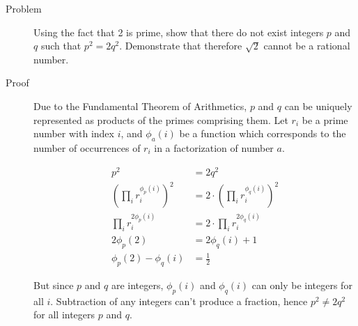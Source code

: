 \begin{description}
\item[Problem] Using the fact that 2 is prime, show that there do not exist
integers $p$ and $q$ such that $p^2 = 2q^2$. Demonstrate that therefore $\sqrt
2$ cannot be a rational number.

\item[Proof] Due to the Fundamental Theorem of Arithmetics, $p$ and $q$ can be
uniquely represented as products of the primes comprising them. Let $r_i$ be a
prime number with index $i$, and $\phi_a(i)$ be a function which corresponds to
the number of occurrences of $r_i$ in a factorization of number $a$.

\begin{align*}
p^2 &= 2q^2 \\
\left(\prod_i r_i^{\phi_p(i)}\right)^2 &= 2 \cdot \left(\prod_i
r_i^{\phi_q(i)}\right)^2 \\
\prod_i r_i^{2\phi_p(i)} &= 2 \cdot \prod_i r_i^{2\phi_q(i)} \\
2\phi_p(2) &= 2 \phi_q(i) + 1 \\
\phi_p(2) - \phi_q(i) &= \frac 1 2
\end{align*}

But since $p$ and $q$ are integers, $\phi_p(i)$ and $\phi_q(i)$ can only be
integers for all $i$. Subtraction of any integers can't produce a fraction,
hence $p^2 \ne 2q^2$ for all integers $p$ and $q$.

\end{description}

